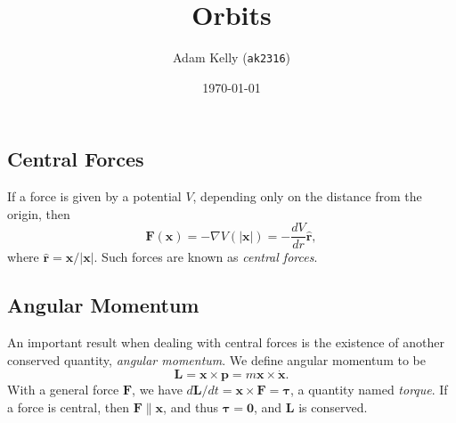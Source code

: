 \documentclass{scrartcl}
\title{Orbits}
\author{Adam Kelly (\texttt{ak2316})}
\date{\today}
\newcommand{\vv}[1]{\boldsymbol{\mathbf{#1}}}
\theoremstyle{definition}
\newcommand{\hh}[1]{\hat{\vv{#1}}}
\begin{document}
\maketitle  

\subsection*{Central Forces}

If a force is given by a potential $V$, depending only on the distance from the origin, then
$$
\vv F(\vv x) = - \nabla V(|\vv x|) = - \frac{dV}{dr} \hh r,
$$
where $\hh r = \vv x/|\vv x|$. Such forces are known as \emph{central forces}.

\subsection*{Angular Momentum}

An important result when dealing with central forces is the existence of another conserved quantity, \emph{angular momentum}. We define angular momentum to be
$$
\vv L = \vv x \times \vv p = m \vv x \times \dot{\vv x}.
$$
With a general force $\vv F$, we have $d \vv L/dt = \vv x \times \vv F = \vv \tau$, a quantity named \emph{torque}. If a force is central, then $\vv F \parallel \vv x$, and thus $\vv \tau = \vv 0$, and $\vv L$ is conserved.
\end{document}
